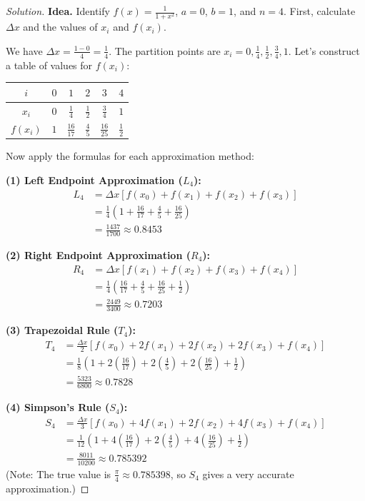 \documentclass[11pt]{article}
\theoremstyle{definition}
\newenvironment{solution}{\begin{proof}[Solution]}{\end{proof}}
\begin{document}
\begin{solution}
\textbf{Idea.} Identify $f(x) = \frac{1}{1+x^2}$, $a=0$, $b=1$, and $n=4$. First, calculate $\Delta x$ and the values of $x_i$ and $f(x_i)$.

We have $\Delta x = \frac{1-0}{4} = \frac{1}{4}$. The partition points are $x_i = 0, \frac{1}{4}, \frac{1}{2}, \frac{3}{4}, 1$. Let's construct a table of values for $f(x_i)$:

\begin{table}[H]
	\centering
\begin{tabular}{|c|c|c|c|c|c|}
	\hline
	$i$ & $0$ & $1$ & $2$ & $3$ & $4$\\
	\hline
	$x_i$ & $0$ & $\frac{1}{4}$ & $\frac{1}{2}$ & $\frac{3}{4}$ & $1$\\
	\hline
	$f(x_i)$ & $1$ & $\frac{16}{17}$ & $\frac{4}{5}$ &$\frac{16}{25}$ & $\frac{1}{2}$\\
	\hline
\end{tabular}
\end{table}

Now apply the formulas for each approximation method:

\textbf{(1) Left Endpoint Approximation ($L_4$):}
\begin{align*}
L_4 &= \Delta x [f(x_0) + f(x_1) + f(x_2) + f(x_3)] \\
&= \frac{1}{4} \left(1 + \frac{16}{17} + \frac{4}{5} + \frac{16}{25}\right) \\
&= \frac{1437}{1700} \approx 0.8453
\end{align*}

\textbf{(2) Right Endpoint Approximation ($R_4$):}
\begin{align*}
R_4 &= \Delta x [f(x_1) + f(x_2) + f(x_3) + f(x_4)] \\
&= \frac{1}{4} \left(\frac{16}{17} + \frac{4}{5} + \frac{16}{25} + \frac{1}{2}\right) \\
&= \frac{2449}{3400} \approx 0.7203
\end{align*}

\textbf{(3) Trapezoidal Rule ($T_4$):}
\begin{align*}
T_4 &= \frac{\Delta x}{2} [f(x_0) + 2f(x_1) + 2f(x_2) + 2f(x_3) + f(x_4)] \\
&= \frac{1}{8} \left(1 + 2\left(\frac{16}{17}\right) + 2\left(\frac{4}{5}\right) + 2\left(\frac{16}{25}\right) + \frac{1}{2}\right) \\
&= \frac{5323}{6800} \approx 0.7828
\end{align*}

\textbf{(4) Simpson's Rule ($S_4$):}
\begin{align*}
S_4 &= \frac{\Delta x}{3} [f(x_0) + 4f(x_1) + 2f(x_2) + 4f(x_3) + f(x_4)] \\
&= \frac{1}{12} \left(1 + 4\left(\frac{16}{17}\right) + 2\left(\frac{4}{5}\right) + 4\left(\frac{16}{25}\right) + \frac{1}{2}\right) \\
&= \frac{8011}{10200} \approx 0.785392
\end{align*}
(Note: The true value is $\frac{\pi}{4} \approx 0.785398$, so $S_4$ gives a very accurate approximation.)
\end{solution}
\end{document}
